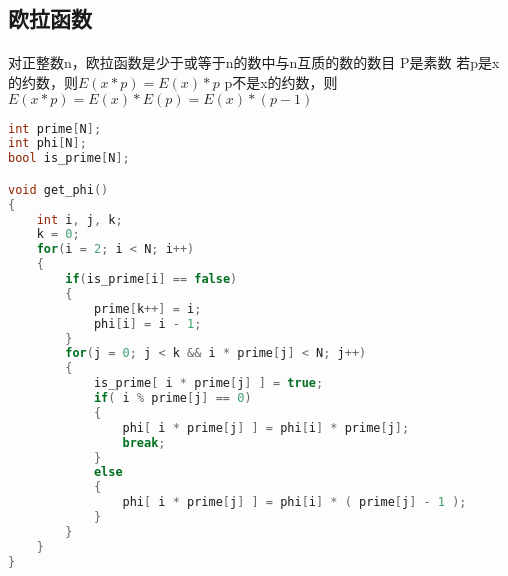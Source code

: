 ﻿\subsection{欧拉函数}
\paragraph{}
对正整数n，欧拉函数是少于或等于n的数中与n互质的数的数目
P是素数
若p是x的约数，则$ E(x*p)=E(x)*p$
p不是x的约数，则$E(x*p)=E(x)*E(p)=E(x)*(p-1)$
    \begin{lstlisting}[language=C++]
int prime[N];
int phi[N];
bool is_prime[N];

void get_phi()
{
    int i, j, k;
    k = 0;
    for(i = 2; i < N; i++)
    {
        if(is_prime[i] == false)
        {
            prime[k++] = i;
            phi[i] = i - 1;
        }
        for(j = 0; j < k && i * prime[j] < N; j++)
        {
            is_prime[ i * prime[j] ] = true;
            if( i % prime[j] == 0)
            {
                phi[ i * prime[j] ] = phi[i] * prime[j];
                break;
            }
            else
            {
                phi[ i * prime[j] ] = phi[i] * ( prime[j] - 1 );
            }
        }
    }
}
\end{lstlisting}
